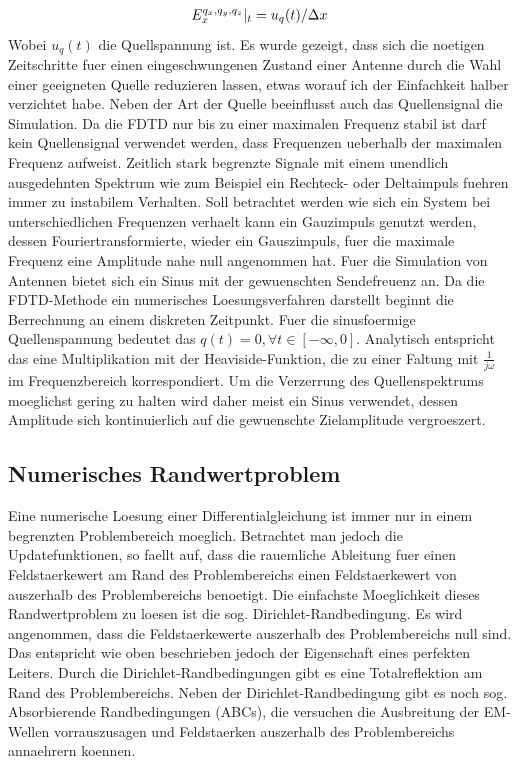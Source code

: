 \documentclass[11pt, ngerman]{article}
\begin{document}
\begin{align}
	\Ef{x}{q_x,q_y, q_z}{0} = u_q(t)/\Delta x
\end{align}
Wobei \(u_q(t)\) die Quellspannung ist. Es wurde gezeigt, dass sich die noetigen Zeitschritte fuer einen
eingeschwungenen Zustand einer Antenne durch die Wahl einer geeigneten Quelle reduzieren lassen\cite{advanced_gap_feed},
etwas worauf ich der Einfachkeit halber verzichtet habe. Neben der Art der Quelle beeinflusst auch das Quellensignal die
Simulation. Da die FDTD nur bis zu einer maximalen Frequenz stabil ist darf kein Quellensignal verwendet werden, dass
Frequenzen ueberhalb der maximalen Frequenz aufweist. Zeitlich stark begrenzte Signale mit einem unendlich ausgedehnten
Spektrum wie zum Beispiel ein Rechteck- oder Deltaimpuls fuehren immer zu instabilem Verhalten. Soll betrachtet werden
wie sich ein System bei unterschiedlichen Frequenzen verhaelt kann ein Gauzimpuls genutzt werden, dessen Fouriertransformierte,
wieder ein Gauszimpuls, fuer die maximale Frequenz eine Amplitude nahe null angenommen hat.
Fuer die Simulation von Antennen bietet sich ein Sinus mit der gewuenschten Sendefreuenz an. Da die FDTD-Methode ein
numerisches Loesungsverfahren darstellt beginnt die Berrechnung an einem diskreten Zeitpunkt. Fuer die
sinusfoermige Quellenspannung bedeutet das \(q(t) = 0, \forall t \in [-\infty, 0]\).
Analytisch entspricht das eine Multiplikation mit der Heaviside-Funktion, die zu einer Faltung mit
\(\frac{1}{j\omega}\) im Frequenzbereich korrespondiert. Um die Verzerrung des Quellenspektrums moeglichst gering zu halten wird daher
meist ein Sinus verwendet, dessen Amplitude sich kontinuierlich auf die gewuenschte Zielamplitude vergroeszert\cite{ramped_sin}.


\subsection{Numerisches Randwertproblem}
Eine numerische Loesung einer Differentialgleichung ist immer nur in einem begrenzten Problembereich moeglich.
Betrachtet man jedoch die Updatefunktionen, so faellt auf, dass die rauemliche Ableitung fuer einen Feldstaerkewert
am Rand des Problembereichs einen Feldstaerkewert von auszerhalb des Problembereichs benoetigt.
Die einfachste Moeglichkeit dieses Randwertproblem zu loesen ist die sog. Dirichlet-Randbedingung.
Es wird angenommen, dass die Feldstaerkewerte auszerhalb des Problembereichs null sind\cite{dirichlet_nbc}.
Das entspricht wie oben beschrieben jedoch der Eigenschaft eines perfekten Leiters. Durch die Dirichlet-Randbedingungen
gibt es eine Totalreflektion am Rand des Problembereichs.
Neben der Dirichlet-Randbedingung gibt es noch sog. Absorbierende Randbedingungen (ABCs), die versuchen
die Ausbreitung der EM-Wellen vorrauszusagen und Feldstaerken auszerhalb des Problembereichs annaehrern koennen.
\end{document}
